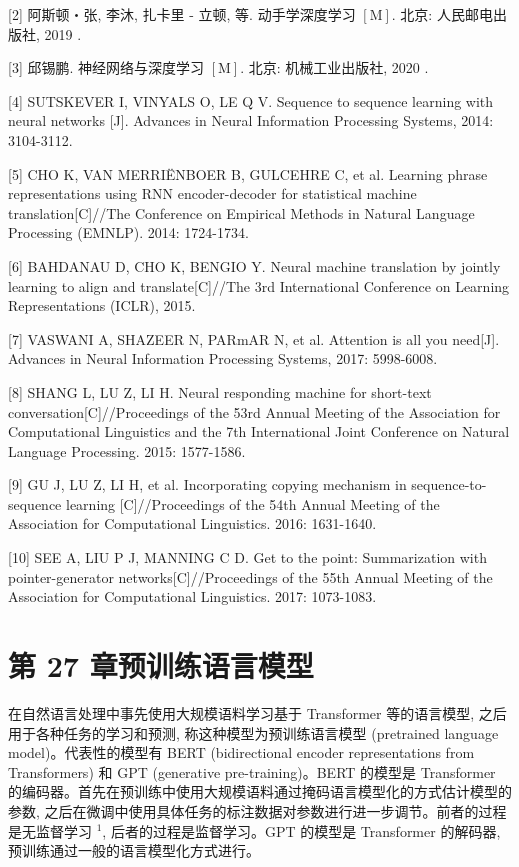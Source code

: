 \documentclass[10pt]{article}
\begin{document}
[2] 阿斯顿・张, 李沐, 扎卡里 - 立顿, 等. 动手学深度学习 $[\mathrm{M}]$. 北京: 人民邮电出版社, 2019 .

[3] 邱锡鹏. 神经网络与深度学习 $[\mathrm{M}]$. 北京: 机械工业出版社, 2020 .

[4] SUTSKEVER I, VINYALS O, LE Q V. Sequence to sequence learning with neural networks [J]. Advances in Neural Information Processing Systems, 2014: 3104-3112.

[5] CHO K, VAN MERRIËNBOER B, GULCEHRE C, et al. Learning phrase representations using RNN encoder-decoder for statistical machine translation[C]//The Conference on Empirical Methods in Natural Language Processing (EMNLP). 2014: 1724-1734.

[6] BAHDANAU D, CHO K, BENGIO Y. Neural machine translation by jointly learning to align and translate[C]//The 3rd International Conference on Learning Representations (ICLR), 2015.

[7] VASWANI A, SHAZEER N, PARmAR N, et al. Attention is all you need[J]. Advances in Neural Information Processing Systems, 2017: 5998-6008.

[8] SHANG L, LU Z, LI H. Neural responding machine for short-text conversation[C]//Proceedings of the 53rd Annual Meeting of the Association for Computational Linguistics and the 7th International Joint Conference on Natural Language Processing. 2015: 1577-1586.

[9] GU J, LU Z, LI H, et al. Incorporating copying mechanism in sequence-to-sequence learning [C]//Proceedings of the 54th Annual Meeting of the Association for Computational Linguistics. 2016: 1631-1640.

[10] SEE A, LIU P J, MANNING C D. Get to the point: Summarization with pointer-generator networks[C]//Proceedings of the 55th Annual Meeting of the Association for Computational Linguistics. 2017: 1073-1083.

\section*{第 27 章预训练语言模型}
在自然语言处理中事先使用大规模语料学习基于 Transformer 等的语言模型, 之后用于各种任务的学习和预测, 称这种模型为预训练语言模型 (pretrained language model)。代表性的模型有 BERT (bidirectional encoder representations from Transformers) 和 GPT (generative pre-training)。BERT 的模型是 Transformer 的编码器。首先在预训练中使用大规模语料通过掩码语言模型化的方式估计模型的参数, 之后在微调中使用具体任务的标注数据对参数进行进一步调节。前者的过程是无监督学习 ${ }^{1}$, 后者的过程是监督学习。GPT 的模型是 Transformer 的解码器, 预训练通过一般的语言模型化方式进行。
\end{document}
